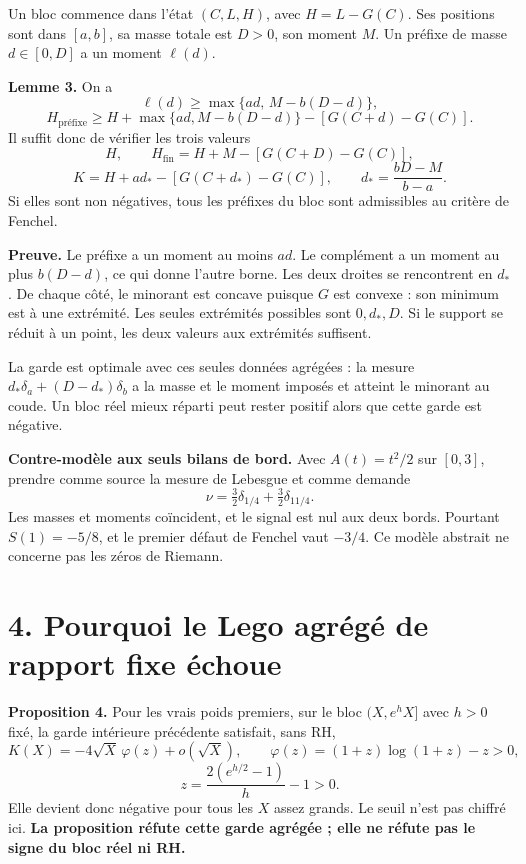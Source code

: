 \documentclass[
  11pt,
  a4paper,
]{article}
\begin{document}
Un bloc commence dans l'état \((C,L,H)\), avec \(H=L-G(C)\). Ses
positions sont dans \([a,b]\), sa masse totale est \(D>0\), son moment
\(M\). Un préfixe de masse \(d\in[0,D]\) a un moment \(\ell(d)\).

\textbf{Lemme 3.} On a \[
\ell(d)\ge\max\{ad,\,M-b(D-d)\},
\] \[
H_{\text{préfixe}}\ge
H+\max\{ad,M-b(D-d)\}-[G(C+d)-G(C)].
\] Il suffit donc de vérifier les trois valeurs \[
H,\qquad H_{\text{fin}}=H+M-[G(C+D)-G(C)],
\] \[
K=H+a d_*-[G(C+d_*)-G(C)],\qquad d_* =\frac{bD-M}{b-a}.
\] Si elles sont non négatives, tous les préfixes du bloc sont
admissibles au critère de Fenchel.

\textbf{Preuve.} Le préfixe a un moment au moins \(ad\). Le complément a
un moment au plus \(b(D-d)\), ce qui donne l'autre borne. Les deux
droites se rencontrent en \(d_*\). De chaque côté, le minorant est
concave puisque \(G\) est convexe : son minimum est à une extrémité. Les
seules extrémités possibles sont \(0,d_*,D\). Si le support se réduit à
un point, les deux valeurs aux extrémités suffisent.

La garde est optimale avec ces seules données agrégées : la mesure
\(d_*\delta_a+(D-d_*)\delta_b\) a la masse et le moment imposés et
atteint le minorant au coude. Un bloc réel mieux réparti peut rester
positif alors que cette garde est négative.

\textbf{Contre-modèle aux seuls bilans de bord.} Avec \(A(t)=t^2/2\) sur
\([0,3]\), prendre comme source la mesure de Lebesgue et comme demande
\[
\nu=\tfrac32\delta_{1/4}+\tfrac32\delta_{11/4}.
\] Les masses et moments coïncident, et le signal est nul aux deux
bords. Pourtant \(S(1)=-5/8\), et le premier défaut de Fenchel vaut
\(-3/4\). Ce modèle abstrait ne concerne pas les zéros de Riemann.

\newpage

\hypertarget{pourquoi-le-lego-agruxe9guxe9-de-rapport-fixe-uxe9choue}{%
\section{4. Pourquoi le Lego agrégé de rapport fixe
échoue}\label{pourquoi-le-lego-agruxe9guxe9-de-rapport-fixe-uxe9choue}}

\textbf{Proposition 4.} Pour les vrais poids premiers, sur le bloc
\((X,e^hX]\) avec \(h>0\) fixé, la garde intérieure précédente
satisfait, sans RH, \[
K(X)=-4\sqrt X\,\varphi(z)+o(\sqrt X),\qquad
\varphi(z)=(1+z)\log(1+z)-z>0,
\] \[
z=\frac{2(e^{h/2}-1)}h-1>0.
\] Elle devient donc négative pour tous les \(X\) assez grands. Le seuil
n'est pas chiffré ici. \textbf{La proposition réfute cette garde agrégée
; elle ne réfute pas le signe du bloc réel ni RH.}
\end{document}
